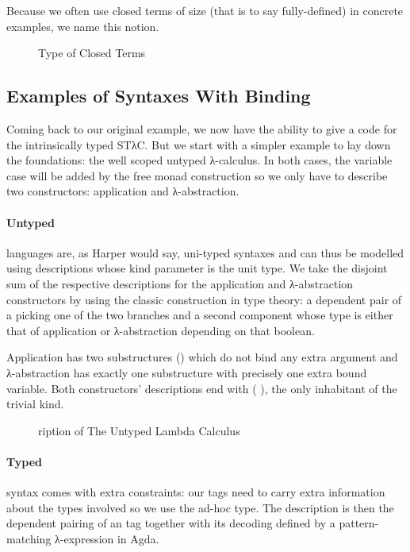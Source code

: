 Because we often use closed terms of size  (that is to say fully-defined)
in concrete examples, we name this notion.

\begin{figure}[h]
\caption{Type of Closed Terms\label{fig:closedtm}}
\end{figure}

\subsection{Examples of Syntaxes With Binding}

Coming back to our original example, we now have the ability to give a code for
the intrinsically typed STλC. But we start with a simpler example to lay
down the foundations: the well scoped untyped λ-calculus. In both cases, the
variable case will be added by the free monad construction so we only have to
describe two constructors: application and λ-abstraction.

\paragraph{Untyped} languages are, as Harper would say, uni-typed syntaxes and
can thus be modelled using descriptions whose kind parameter is the unit type.
We take the disjoint sum of the respective descriptions for the application and
λ-abstraction constructors by using the classic construction in type theory: a
dependent pair of a  picking one of the two branches and a second
component whose type is either that of application or λ-abstraction depending
on that boolean.

Application has two substructures () which do not bind any extra argument
and λ-abstraction has exactly one substructure with precisely one extra bound variable.
Both constructors' descriptions end with ( ), the only inhabitant
of the trivial kind.

\begin{figure}[h]
\caption{ription of The Untyped Lambda Calculus\label{fig:desculc}}
\end{figure}


\paragraph{Typed} syntax comes with extra constraints: our tags need to carry
extra information about the types involved so we use the ad-hoc  type.
The description is then the dependent pairing of an  tag together with
its decoding defined by a pattern-matching λ-expression in Agda.

